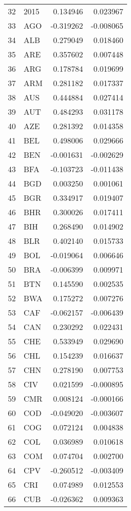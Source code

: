 \begin{tabular}{llrr}
32 & 2015 & 0.134946 & 0.023967 \\
33 & AGO & -0.319262 & -0.008065 \\
34 & ALB & 0.279049 & 0.018460 \\
35 & ARE & 0.357602 & 0.007448 \\
36 & ARG & 0.178784 & 0.019699 \\
37 & ARM & 0.281182 & 0.017337 \\
38 & AUS & 0.444884 & 0.027414 \\
39 & AUT & 0.484293 & 0.031178 \\
40 & AZE & 0.281392 & 0.014358 \\
41 & BEL & 0.498006 & 0.029666 \\
42 & BEN & -0.001631 & -0.002629 \\
43 & BFA & -0.103723 & -0.011438 \\
44 & BGD & 0.003250 & 0.001061 \\
45 & BGR & 0.334917 & 0.019407 \\
46 & BHR & 0.300026 & 0.017411 \\
47 & BIH & 0.268490 & 0.014902 \\
48 & BLR & 0.402140 & 0.015733 \\
49 & BOL & -0.019064 & 0.006646 \\
50 & BRA & -0.006399 & 0.009971 \\
51 & BTN & 0.145590 & 0.002535 \\
52 & BWA & 0.175272 & 0.007276 \\
53 & CAF & -0.062157 & -0.006439 \\
54 & CAN & 0.230292 & 0.022431 \\
55 & CHE & 0.533949 & 0.029690 \\
56 & CHL & 0.154239 & 0.016637 \\
57 & CHN & 0.278190 & 0.007753 \\
58 & CIV & 0.021599 & -0.000895 \\
59 & CMR & 0.008124 & -0.000166 \\
60 & COD & -0.049020 & -0.003607 \\
61 & COG & 0.072124 & 0.004838 \\
62 & COL & 0.036989 & 0.010618 \\
63 & COM & 0.074704 & 0.002700 \\
64 & CPV & -0.260512 & -0.003409 \\
65 & CRI & 0.074989 & 0.012553 \\
66 & CUB & -0.026362 & 0.009363 \\

\end{tabular}
